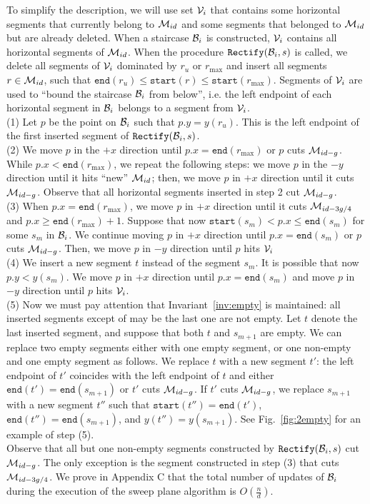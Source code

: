 \documentclass[10pt]{llncs}
\def\idtt#1{\ensuremath{\mathtt{#1}}}
\newcommand{\cM}{{\cal M}}
\newcommand{\cB}{{\cal B}}
\newcommand{\cV}{{\cal V}}
\newcommand{\sleft}{\idtt{start}}
\newcommand{\sright}{\idtt{end}}
\newcommand{\Rectify}{\idtt{Rectify}}
\begin{document}
To simplify the description, we will use  set  $\cV_i$ 
that  contains some horizontal 
segments that currently  belong to  $\cM_{id}$ and some segments 
that belonged to $\cM_{id}$ but are already deleted. 
When a staircase $\cB_i$ is constructed, $\cV_i$ contains all 
horizontal segments of $\cM_{id}$. When the procedure $\Rectify(\cB_i,s)$ 
is called, we delete all segments of $\cV_{i}$ dominated by $r_u$ or 
$r_{\max}$ and insert all segments $r\in \cM_{id}$, such that 
$\sright(r_u) \leq  \sleft(r) \leq \sleft(r_{\max})$. Segments 
of $\cV_i$ are used to  ``bound the staircase $\cB_i$ from below'', 
i.e. the left endpoint of each horizontal segment in $\cB_i$ belongs 
to a segment from $\cV_i$.  \\
(1)  
Let $p$ be the point on $\cB_i$ such that $p.y = y(r_u)$. This is the left 
endpoint of the first inserted segment of $\Rectify(\cB_i,s)$.\\
(2) We move $p$ in the $+x$ direction until $p.x=\sright(r_{\max})$ or $p$ 
cuts $\cM_{id-g}$. While  $p.x < \sright(r_{\max})$, we repeat the following 
steps: we move $p$ in the $-y$ direction until it hits ``new'' 
$\cM_{id}$; then, we move $p$ in $+x$ direction until it 
cuts $\cM_{id-g}$. Observe that all horizontal segments inserted in step 2 
cut $\cM_{id-g}$.\\
(3) When  $p.x=\sright(r_{\max})$, we move $p$ in $+x$ direction until 
it cuts $\cM_{id-3g/4}$ and $p.x\geq \sright(r_{\max})+1$. 
Suppose 
that now $\sleft(s_m)< p.x \leq \sright(s_m)$ for some $s_m$ in $\cB_i$. 
We continue 
moving $p$ in $+x$ direction until $p.x=\sright(s_m)$ or $p$ cuts 
$\cM_{id-g}$. Then, we move $p$ in $-y$ direction until $p$ hits 
$\cV_i$\\ (4) We insert a new segment $t$ instead of the segment $s_m$. It is possible 
that now $p.y < y(s_m)$.
We move $p$ in $+x$ direction until  $p.x=\sright(s_{m})$ and move $p$ in 
$-y$ direction until $p$ hits $\cV_i$. \\  (5) Now we must pay attention that  Invariant~\ref{inv:empty} is
 maintained: all inserted segments except of may be the last one are not 
empty. 
Let $t$ denote the last inserted segment, and suppose that both $t$ 
and $s_{m+1}$ are empty. We can replace two empty segments 
either with one empty segment, or one non-empty and one empty segment
as follows. We replace  $t$ with a new segment $t'$: 
the left endpoint of $t'$ coincides with the left endpoint of $t$ and 
either  $\sright(t')=\sright(s_{m+1})$ or  
$t'$ cuts $\cM_{id-g}$. 
If $t'$ cuts $\cM_{id-g}$, we replace $s_{m+1}$ with a new 
segment $t''$ such that $\sleft(t'')=\sright(t')$, $\sright(t'')=\sright(s_{m+1})$, 
and $y(t'')=y(s_{m+1})$. See Fig.~\ref{fig:2empty} for an example of
 step (5).\\
Observe that all but one non-empty segments constructed by 
$\Rectify(\cB_i,s)$ cut $\cM_{id-g}$. The only exception is the segment 
constructed in step (3) that cuts $\cM_{id-3g/4}$. 
We prove in Appendix C 
that the total number of updates of $\cB_i$ 
during the execution of the sweep plane algorithm is $O(\frac{n}{d})$. 
\end{document}
